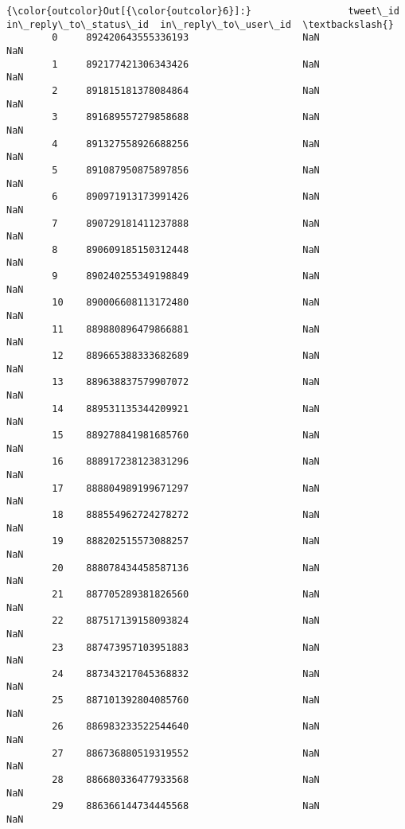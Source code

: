 \documentclass[11pt]{article}
\begin{document}
\begin{Verbatim}[commandchars=\\\{\}]
{\color{outcolor}Out[{\color{outcolor}6}]:}                 tweet\_id  in\_reply\_to\_status\_id  in\_reply\_to\_user\_id  \textbackslash{}
        0     892420643555336193                    NaN                  NaN   
        1     892177421306343426                    NaN                  NaN   
        2     891815181378084864                    NaN                  NaN   
        3     891689557279858688                    NaN                  NaN   
        4     891327558926688256                    NaN                  NaN   
        5     891087950875897856                    NaN                  NaN   
        6     890971913173991426                    NaN                  NaN   
        7     890729181411237888                    NaN                  NaN   
        8     890609185150312448                    NaN                  NaN   
        9     890240255349198849                    NaN                  NaN   
        10    890006608113172480                    NaN                  NaN   
        11    889880896479866881                    NaN                  NaN   
        12    889665388333682689                    NaN                  NaN   
        13    889638837579907072                    NaN                  NaN   
        14    889531135344209921                    NaN                  NaN   
        15    889278841981685760                    NaN                  NaN   
        16    888917238123831296                    NaN                  NaN   
        17    888804989199671297                    NaN                  NaN   
        18    888554962724278272                    NaN                  NaN   
        19    888202515573088257                    NaN                  NaN   
        20    888078434458587136                    NaN                  NaN   
        21    887705289381826560                    NaN                  NaN   
        22    887517139158093824                    NaN                  NaN   
        23    887473957103951883                    NaN                  NaN   
        24    887343217045368832                    NaN                  NaN   
        25    887101392804085760                    NaN                  NaN   
        26    886983233522544640                    NaN                  NaN   
        27    886736880519319552                    NaN                  NaN   
        28    886680336477933568                    NaN                  NaN   
        29    886366144734445568                    NaN                  NaN   

\end{Verbatim}
\end{document}
